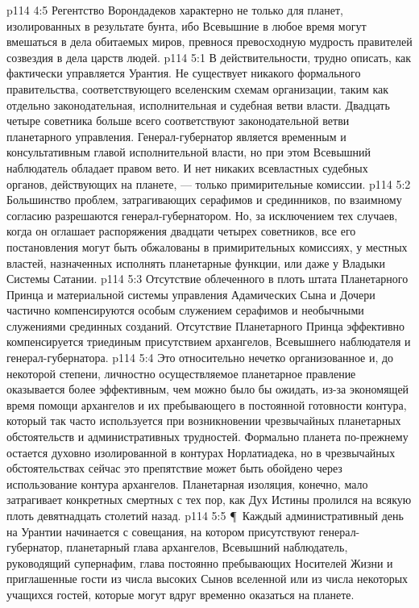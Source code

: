 \vs p114 4:5 Регентство Ворондадеков характерно не только для планет, изолированных в результате бунта, ибо Всевышние в любое время могут вмешаться в дела обитаемых миров, превнося превосходную мудрость правителей созвездия в дела царств людей.
\vs p114 5:1 В действительности, трудно описать, как фактически управляется Урантия. Не существует никакого формального правительства, соответствующего вселенским схемам организации, таким как отдельно законодательная, исполнительная и судебная ветви власти. Двадцать четыре советника больше всего соответствуют законодательной ветви планетарного управления. Генерал\hyp{}губернатор является временным и консультативным главой исполнительной власти, но при этом Всевышний наблюдатель обладает правом вето. И нет никаких всевластных судебных органов, действующих на планете, --- только примирительные комиссии.
\vs p114 5:2 Большинство проблем, затрагивающих серафимов и срединников, по взаимному согласию разрешаются генерал\hyp{}губернатором. Но, за исключением тех случаев, когда он оглашает распоряжения двадцати четырех советников, все его постановления могут быть обжалованы в примирительных комиссиях, у местных властей, назначенных исполнять планетарные функции, или даже у Владыки Системы Сатании.
\vs p114 5:3 Отсутствие облеченного в плоть штата Планетарного Принца и материальной системы управления Адамических Сына и Дочери частично компенсируются особым служением серафимов и необычными служениями срединных созданий. Отсутствие Планетарного Принца эффективно компенсируется триединым присутствием архангелов, Всевышнего наблюдателя и генерал\hyp{}губернатора.
\vs p114 5:4 Это относительно нечетко организованное и, до некоторой степени, личностно осуществляемое планетарное правление оказывается более эффективным, чем можно было бы ожидать, из\hyp{}за экономящей время помощи архангелов и их пребывающего в постоянной готовности контура, который так часто используется при возникновении чрезвычайных планетарных обстоятельств и административных трудностей. Формально планета по\hyp{}прежнему остается духовно изолированной в контурах Норлатиадека, но в чрезвычайных обстоятельствах сейчас это препятствие может быть обойдено через использование контура архангелов. Планетарная изоляция, конечно, мало затрагивает конкретных смертных с тех пор, как Дух Истины пролился на всякую плоть девятнадцать столетий назад.
\vs p114 5:5 \P\ Каждый административный день на Урантии начинается с совещания, на котором присутствуют генерал\hyp{}губернатор, планетарный глава архангелов, Всевышний наблюдатель, руководящий супернафим, глава постоянно пребывающих Носителей Жизни и приглашенные гости из числа высоких Сынов вселенной или из числа некоторых учащихся гостей, которые могут вдруг временно оказаться на планете.
